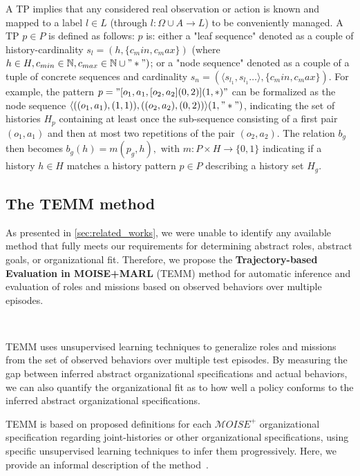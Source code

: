 \documentclass[pdflatex,sn-mathphys-num]{sn-jnl}%
\theoremstyle{thmstyleone}%
\theoremstyle{thmstyletwo}%
\theoremstyle{thmstylethree}%
\begin{document}
A TP implies that any considered real observation or action is known and mapped to a label $l \in L$ (through $l: \Omega \cup A \to L$) to be conveniently managed. A TP $p \in P$ is defined as follows: $p$ is: either a "leaf sequence" denoted as a couple of history-cardinality $s_l = (h, \{c_min,c_max\})$ (where $h \in H, c_{min} \in \mathbb{N}, c_{max} \in \mathbb{N} \cup "*")$; or a "node sequence" denoted as a couple of a tuple of concrete sequences and cardinality $s_n = (\langle s_{l_1}, s_{l_1}\dots \rangle, \{c_min,c_max\})$. For example, the pattern $p = \allowbreak "[o_1,a_1,[o_2,a_2](0,2)](1,*)"$ can be formalized as the node sequence $\allowbreak \langle ((o_1,a_1),(1,1)), ((o_2,a_2),(0,2))\rangle(1,"*")$, indicating the set of histories $H_p$ containing at least once the sub-sequence consisting of a first pair $(o_1,a_1)$ and then at most two repetitions of the pair $(o_2,a_2)$.
The relation $b_g$ then becomes $b_g(h) = m(p_g,h), \text{ with } m: P \times H \to \{0,1\}$ indicating if a history $h \in H$ matches a history pattern $p \in P$ describing a history set $H_g$.

\subsection{The TEMM method}

As presented in \autoref{sec:related_works}, we were unable to identify any available method that fully meets our requirements for determining abstract roles, abstract goals, or organizational fit. Therefore, we propose the \textbf{Trajectory-based Evaluation in MOISE+MARL} (TEMM) method for automatic inference and evaluation of roles and missions based on observed behaviors over multiple episodes.

\

\noindent TEMM uses unsupervised learning techniques to generalize roles and missions from the set of observed behaviors over multiple test episodes. By measuring the gap between inferred abstract organizational specifications and actual behaviors, we can also quantify the organizational fit as to how well a policy conforms to the inferred abstract organizational specifications.

TEMM is based on proposed definitions for each $\mathcal{M}OISE^+$ organizational specification regarding joint-histories or other organizational specifications, using specific unsupervised learning techniques to infer them progressively. Here, we provide an informal description of the method~\hyperref[fn:github]{\footnotemark[1]}.
%
\end{document}
